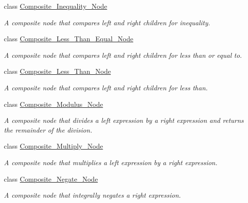 \begin{DoxyCompactItemize}
class \hyperlink{classMadara_1_1Expression__Tree_1_1Composite__Inequality__Node}{Composite\_\-Inequality\_\-Node}
\begin{DoxyCompactList}\small\item\em A composite node that compares left and right children for inequality. \item\end{DoxyCompactList}\item 
class \hyperlink{classMadara_1_1Expression__Tree_1_1Composite__Less__Than__Equal__Node}{Composite\_\-Less\_\-Than\_\-Equal\_\-Node}
\begin{DoxyCompactList}\small\item\em A composite node that compares left and right children for less than or equal to. \item\end{DoxyCompactList}\item 
class \hyperlink{classMadara_1_1Expression__Tree_1_1Composite__Less__Than__Node}{Composite\_\-Less\_\-Than\_\-Node}
\begin{DoxyCompactList}\small\item\em A composite node that compares left and right children for less than. \item\end{DoxyCompactList}\item 
class \hyperlink{classMadara_1_1Expression__Tree_1_1Composite__Modulus__Node}{Composite\_\-Modulus\_\-Node}
\begin{DoxyCompactList}\small\item\em A composite node that divides a left expression by a right expression and returns the remainder of the division. \item\end{DoxyCompactList}\item 
class \hyperlink{classMadara_1_1Expression__Tree_1_1Composite__Multiply__Node}{Composite\_\-Multiply\_\-Node}
\begin{DoxyCompactList}\small\item\em A composite node that multiplies a left expression by a right expression. \item\end{DoxyCompactList}\item 
class \hyperlink{classMadara_1_1Expression__Tree_1_1Composite__Negate__Node}{Composite\_\-Negate\_\-Node}
\begin{DoxyCompactList}\small\item\em A composite node that integrally negates a right expression. \item\end{DoxyCompactList}\item 

\end{DoxyCompactItemize}
